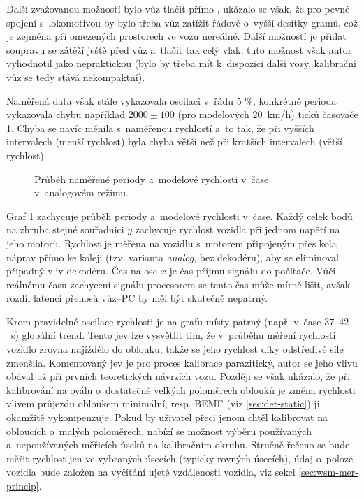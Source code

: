 Další zvažovanou možností bylo vůz tlačit přímo ,
ukázalo se však, že pro pevné spojení s~lokomotivou by bylo třeba vůz zatížit
řádově o~vyšší desítky gramů, což je zejména při omezených prostorech ve vozu
nereálné. Další možností je přidat soupravu se zátěží ještě před vůz a~tlačit
tak celý vlak, tuto možnost však autor vyhodnotil jako nepraktickou (bylo by
třeba mít k~dispozici další vozy, kalibrační vůz se tedy stává nekompaktní).

Naměřená data však stále vykazovala oscilaci v~řádu 5 \%, konkrétně perioda
vykazovala chybu například $2000 \pm 100$ (pro modelových 20~km/h) ticků
časovače 1. Chyba se navíc měnila s~naměřenou rychlostí a~to tak, že při
vyšších intervalech (menší rychlost) byla chyba větší než při kratších
intervalech (větší rychlost).

\begin{figure}[ht]

\caption{Průběh naměřené periody a~modelové rychlosti v~čase v~analogovém
režimu.}
\label{fig:speed-analog}
\end{figure}

Graf \ref{fig:speed-analog} zachycuje průběh periody a~modelové rychlosti
v~čase. Každý celek bodů na zhruba stejné souřadnici $y$ zachycuje rychlost
vozidla při jednom napětí na jeho motoru. Rychlost je měřena na vozidlu
s~motorem připojeným přes kola náprav přímo ke koleji (tzv. varianta
\textit{analog}, bez dekodéru), aby se eliminoval případný vliv dekodéru. Čas
na ose $x$ je čas příjmu signálu do počítače. Vůči reálnému času zachycení
signálu procesorem se tento čas může mírně lišit, avšak rozdíl latencí
přenosů vůz--PC by měl být skutečně nepatrný.

Krom pravidelné oscilace rychlosti je na grafu místy patrný (např. v~čase
$37$--$42$~s) globální  trend. Tento jev lze vysvětlit tím, že
v~průběhu měření rychlosti vozidlo zrovna najíždělo do oblouku, takže se jeho
rychlost díky odstředivé síle zmenšila. Komentovaný jev je pro proces kalibrace
parazitický, autor se jeho vlivu obával už při prvních teoretických návrzích
vozu. Později se však ukázalo, že při kalibrování na oválu o~dostatečně velkých
poloměrech oblouků je změna rychlosti vlivem průjezdu obloukem minimální, resp.
\gls{BEMF} (viz \ref{sec:det-static}) ji okamžitě vykompenzuje. Pokud by uživatel
přeci jenom chtěl kalibrovat na obloucích o~malých poloměrech, nabízí se
možnost výběru používaných a~nepoužívaných měřicích úseků na kalibračním
okruhu. Stručně řečeno se bude měřit rychlost jen ve vybraných úsecích (typicky
rovných úsecích), údaj o~poloze vozidla bude založen na vyčítání ujeté
vzdálenosti vozidla, viz sekci \ref{sec:wsm-mer-princip}.

